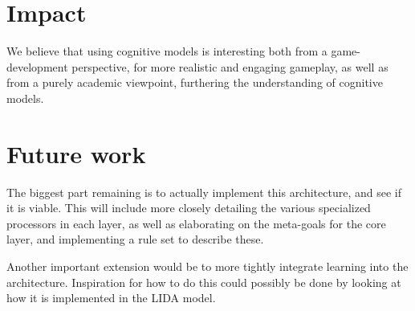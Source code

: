 \section{Impact}
We believe that using cognitive models is interesting both from a
game-development perspective, for more realistic and engaging gameplay, as well
as from a purely academic viewpoint, furthering the understanding of cognitive
models.

\section{Future work}
The biggest part remaining is to actually implement this architecture, and see
if it is viable. This will include more closely detailing the various
specialized processors in each layer, as well as elaborating on the meta-goals
for the core layer, and implementing a rule set to describe these.

Another important extension would be to more tightly integrate learning into
the architecture. Inspiration for how to do this could possibly be done by
looking at how it is implemented in the LIDA model\cite{franklin2007lida}.